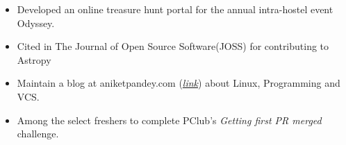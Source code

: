 
{\fontsize{11pt}{1em}\bodyfontlight\upshape\color{text}
\begin{itemize}
  \itemsep-0.4em
  \item Developed an online treasure hunt portal for the annual intra-hostel event Odyssey.
  \item Cited in The Journal of Open Source Software(JOSS) for contributing to Astropy\textsuperscript{\texttrademark}
  \item Maintain a blog at aniketpandey.com (\textit{\href{http://aniketpandey.com/homepage}{link}}) about Linux, Programming and VCS.
  \item Among the select freshers to complete PClub's \textit{Getting first PR merged} challenge.
\end{itemize}
}

